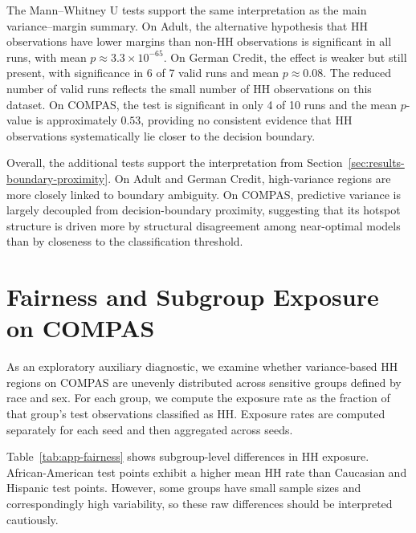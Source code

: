 The Mann--Whitney U tests support the same interpretation as the main variance--margin
summary. On Adult, the alternative hypothesis that HH observations have lower margins
than non-HH observations is significant in all runs, with mean \(p \approx 3.3 \times
10^{-65}\). On German Credit, the effect is weaker but still present, with significance in
6 of 7 valid runs and mean \(p \approx 0.08\). The reduced number of valid runs reflects
the small number of HH observations on this dataset. On COMPAS, the test is significant
in only 4 of 10 runs and the mean \(p\)-value is approximately \(0.53\), providing no
consistent evidence that HH observations systematically lie closer to the decision boundary.

Overall, the additional tests support the interpretation from
Section~\ref{sec:results-boundary-proximity}. On Adult and German Credit,
high-variance regions are more closely linked to boundary ambiguity. On COMPAS,
predictive variance is largely decoupled from decision-boundary proximity, suggesting
that its hotspot structure is driven more by structural disagreement among near-optimal
models than by closeness to the classification threshold.

\section{Fairness and Subgroup Exposure on COMPAS}
\label{app:fairness-exposure}

As an exploratory auxiliary diagnostic, we examine whether variance-based HH regions on
COMPAS are unevenly distributed across sensitive groups defined by race and sex. For
each group, we compute the exposure rate as the fraction of that group's test observations
classified as HH. Exposure rates are computed separately for each seed and then aggregated
across seeds.

Table~\ref{tab:app-fairness} shows subgroup-level differences in HH exposure.
African-American test points exhibit a higher mean HH rate than Caucasian and Hispanic
test points. However, some groups have small sample sizes and correspondingly high
variability, so these raw differences should be interpreted cautiously.

\begin{table}[H]
\centering
\caption{COMPAS: HH rates by subgroup (mean $\pm$ standard deviation across 10 seeds). Larger groups
are more reliable.}
\label{tab:app-fairness}
\small

\end{table}

